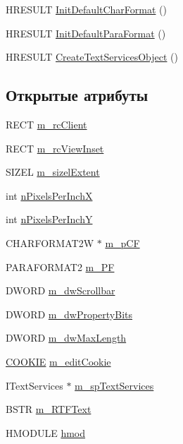 \begin{DoxyCompactItemize}
\item 
H\-R\-E\-S\-U\-L\-T \hyperlink{class_c_formatted_text_draw_a84688cc43aa013fc01eab25bcf687809}{Init\-Default\-Char\-Format} ()
\item 
H\-R\-E\-S\-U\-L\-T \hyperlink{class_c_formatted_text_draw_adf8e13c8ba939b994d4235b588a52177}{Init\-Default\-Para\-Format} ()
\item 
H\-R\-E\-S\-U\-L\-T \hyperlink{class_c_formatted_text_draw_aacdbc394944e8ca679c5de2e824496d5}{Create\-Text\-Services\-Object} ()
\end{DoxyCompactItemize}
\subsection*{Открытые атрибуты}
\begin{DoxyCompactItemize}
\item 
R\-E\-C\-T \hyperlink{class_c_formatted_text_draw_ac12889a14954434340548415c24cd61c}{m\-\_\-rc\-Client}
\item 
R\-E\-C\-T \hyperlink{class_c_formatted_text_draw_a55dfce4f5f6ceebc265f50d39a3e3b18}{m\-\_\-rc\-View\-Inset}
\item 
S\-I\-Z\-E\-L \hyperlink{class_c_formatted_text_draw_a7a01811c4c6123bea7d639302b69a128}{m\-\_\-sizel\-Extent}
\item 
int \hyperlink{class_c_formatted_text_draw_af07e4ff84b148e4c1614782ec37b9b54}{n\-Pixels\-Per\-Inch\-X}
\item 
int \hyperlink{class_c_formatted_text_draw_aed39a1517760cfb53599780e231d481b}{n\-Pixels\-Per\-Inch\-Y}
\item 
C\-H\-A\-R\-F\-O\-R\-M\-A\-T2\-W $\ast$ \hyperlink{class_c_formatted_text_draw_add7687bda35106a487299a6bd945e0fe}{m\-\_\-p\-C\-F}
\item 
P\-A\-R\-A\-F\-O\-R\-M\-A\-T2 \hyperlink{class_c_formatted_text_draw_ae5c1b692255587fff873eb3cae1e30a0}{m\-\_\-\-P\-F}
\item 
D\-W\-O\-R\-D \hyperlink{class_c_formatted_text_draw_ae015d2a67f789b83b172077ca92fedba}{m\-\_\-dw\-Scrollbar}
\item 
D\-W\-O\-R\-D \hyperlink{class_c_formatted_text_draw_a4877370e9f9a97ca802f614601ca972c}{m\-\_\-dw\-Property\-Bits}
\item 
D\-W\-O\-R\-D \hyperlink{class_c_formatted_text_draw_a95e778f91604bec6f68d7933550910aa}{m\-\_\-dw\-Max\-Length}
\item 
\hyperlink{formattedtextdraw_8h_a38853a4ceee8d1a6fac128d822488cdc}{C\-O\-O\-K\-I\-E} \hyperlink{class_c_formatted_text_draw_ac3b581340c521c7f372bcce0792e3059}{m\-\_\-edit\-Cookie}
\item 
I\-Text\-Services $\ast$ \hyperlink{class_c_formatted_text_draw_a359702fb97b39932d0f4605f2324c1d3}{m\-\_\-sp\-Text\-Services}
\item 
B\-S\-T\-R \hyperlink{class_c_formatted_text_draw_ae25f82f2e2222357070087b218fcc849}{m\-\_\-\-R\-T\-F\-Text}
\item 
H\-M\-O\-D\-U\-L\-E \hyperlink{class_c_formatted_text_draw_addc46f2c8df18b9be24193ac2b7bd261}{hmod}
\end{DoxyCompactItemize}


